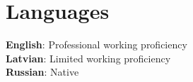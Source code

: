 \documentclass[letterpaper,11pt]{article}
\begin{document}
    \section{Languages}
    \begin{itemize}[leftmargin=0.15in, label={}]
    \small{\item{
        \textbf{English}{: Professional working proficiency} \\
        \textbf{Latvian}{: Limited working proficiency} \\
        \textbf{Russian}{: Native}
    }}
    \end{itemize}
\end{document}
